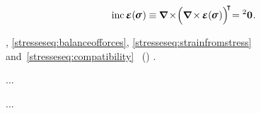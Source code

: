\nopagebreak\vspace{-0.5em}\begin{equation}\label{stresseseq:compatibility}
\operatorname{inc} \infinitesimaldeformation(\hspace{-0.15ex}\linearstress\hspace{.1ex}) \hspace{-0.06ex}
\equiv
\hspace{-0.07ex} \boldnabla \hspace{-0.2ex} \times \hspace{-0.44ex} \Bigl( \boldnabla \hspace{-0.2ex} \times \hspace{-0.16ex} \infinitesimaldeformation(\hspace{-0.15ex}\linearstress\hspace{.1ex}) \Bigr)^{\raisemath{-0.12em}{\hspace{-0.44ex}\T}} \hspace{-0.52ex}
= {^2\bm{0}}
\hspace{.1ex} .
\end{equation}

\vspace{-0.3em}\noindent
{}, \eqref{stresseseq:balanceofforces}, \eqref{stresseseq:strainfromstress} and~\eqref{stresseseq:compatibility}  ~()  .


...


...




\label{para:principleofminimumpotentialenergy}

